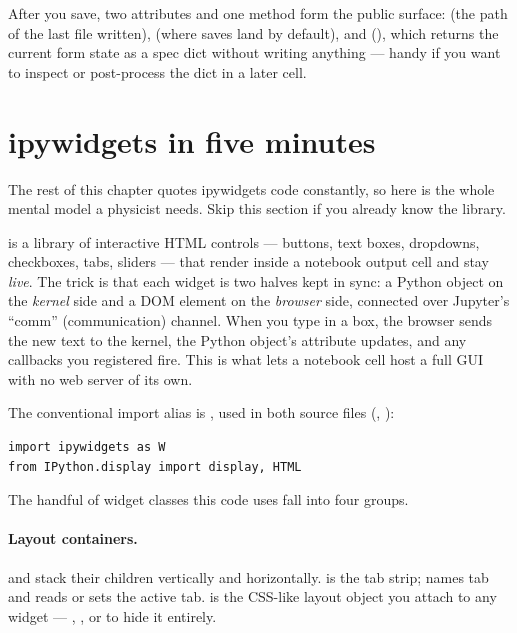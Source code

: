 After you save, two attributes and one method form the public surface:
 (the path of the last file written),
 (where saves land by default), and 
(), which returns the current form state as a spec
dict without writing anything --- handy if you want to inspect or post-process the
dict in a later cell.

\section{ipywidgets in five minutes}

The rest of this chapter quotes ipywidgets code constantly, so here is the whole
mental model a physicist needs. Skip this section if you already know the library.

 is a library of interactive HTML controls --- buttons, text
boxes, dropdowns, checkboxes, tabs, sliders --- that render inside a notebook
output cell and stay \emph{live}. The trick is that each widget is two halves kept
in sync: a Python object on the \emph{kernel} side and a DOM element on the
\emph{browser} side, connected over Jupyter's ``comm'' (communication) channel.
When you type in a box, the browser sends the new text to the kernel, the Python
object's  attribute updates, and any callbacks you registered fire.
This is what lets a notebook cell host a full GUI with no web server of its own.

The conventional import alias is , used in both source files
(, ):

\begin{lstlisting}
import ipywidgets as W
from IPython.display import display, HTML
\end{lstlisting}

The handful of widget classes this code uses fall into four groups.

\paragraph{Layout containers.}  and  stack
their children vertically and horizontally.  is the
tab strip;  names tab  and
 reads or sets the active tab.  is the
CSS-like layout object you attach to any widget --- ,
, or  to hide it entirely.

